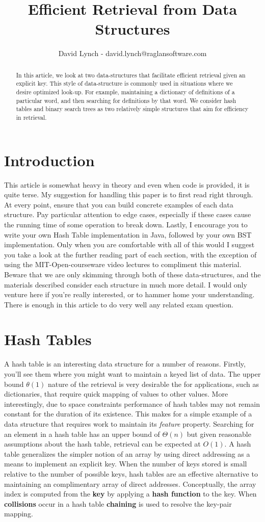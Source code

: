 \documentclass[10pt,a4paper]{article}
\title{Efficient Retrieval from Data Structures}
\author{David Lynch - david.lynch@raglansoftware.com }
\begin{document}
\maketitle
\begin{abstract}
In this article, we look at two data-structures that facilitate efficient retrieval given an explicit key. This style of data-structure is commonly used in situations where we desire optimized look-up. For example, maintaining a dictionary of definitions of a particular word, and then searching  for definitions by that word. We consider hash tables and binary search trees as two relatively simple structures that aim for efficiency in retrieval. 
\end{abstract}
\section{Introduction}
This article is somewhat heavy in theory and even when code is provided, it is quite terse. My suggestion for handling this paper is to first read right through. At every point, ensure that you can build concrete examples of each data structure. Pay particular attention to edge cases, especially if these cases cause the running time of some operation to break down. Lastly, I encourage you to write your own Hash Table implementation in Java, followed by your own BST implementation. Only when you are comfortable with all of this would I suggest you take a look at the further reading part of each section, with the exception of using the MIT-Open-courseware video lectures to compliment this material. Beware that we are only skimming through both of these data-structures, and the materials described consider each structure in much more detail. I would only venture here if you're really interested, or to hammer home your understanding. There is enough in this article to do very well any related exam question. 
\section{Hash Tables}
A hash table is an interesting data structure for a number of reasons. Firstly, you'll see them where you might want to maintain a keyed list of data. The upper bound $\theta(1)$ nature of the retrieval is very desirable the for applications, such as dictionaries, that require quick mapping of values to other values. More interestingly, due to space constraints performance of hash tables may not remain constant for the duration of its existence. This makes for a simple example of a data structure that requires work to maintain its {\it feature} property. Searching for an element in a hash table has an upper bound of $\Theta(n)$ but given reasonable assumptions about the hash table, retrieval can be expected at $O(1)$. A hash table generalizes the simpler notion of an array by using direct addressing as a means to implement an explicit key. When the number of keys stored is small relative to the number of possible keys, hash tables are an effective alternative to maintaining an complimentary array of direct addresses. Conceptually, the array index is computed from the {\bf key} by applying a {\bf hash function} to the key. When {\bf collisions} occur in a hash table {\bf chaining} is used to resolve the key-pair mapping. 
\end{document}
